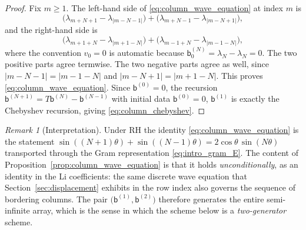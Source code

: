 \documentclass[11pt]{amsart}
\numberwithin{equation}{section}
\theoremstyle{plain}
\theoremstyle{definition}
\theoremstyle{remark}
\newtheorem{remark}[theorem]{Remark}
\newcommand{\RH}{\mathrm{RH}}
\begin{document}
\begin{proof}
Fix $m\ge1$.  The left-hand side of \eqref{eq:column_wave_equation} at index $m$ is
\begin{equation}
 \bigl(\lambda_{m+N+1}-\lambda_{|m-N-1|}\bigr)
 +\bigl(\lambda_{m+N-1}-\lambda_{|m-N+1|}\bigr),
\end{equation}
and the right-hand side is
\begin{equation}
 \bigl(\lambda_{m+1+N}-\lambda_{|m+1-N|}\bigr)
 +\bigl(\lambda_{m-1+N}-\lambda_{|m-1-N|}\bigr),
\end{equation}
where the convention $v_0=0$ is automatic because $\mathsf b^{(N)}_0=\lambda_N-\lambda_N=0$.
The two positive parts agree termwise.  The two negative parts agree as well, since
$|m-N-1|=|m-1-N|$ and $|m-N+1|=|m+1-N|$.  This proves
\eqref{eq:column_wave_equation}.  Since $\mathsf b^{(0)}=0$, the recursion
$\mathsf b^{(N+1)}=T\mathsf b^{(N)}-\mathsf b^{(N-1)}$ with initial data
$\mathsf b^{(0)}=0$, $\mathsf b^{(1)}$ is exactly the Chebyshev recursion, giving
\eqref{eq:column_chebyshev}.
\end{proof}

\begin{remark}[Interpretation]
\label{rem:column_wave_meaning}
Under $\RH$ the identity \eqref{eq:column_wave_equation} is the statement
$\sin((N+1)\theta)+\sin((N-1)\theta)=2\cos\theta\,\sin(N\theta)$ transported through the
Gram representation \eqref{eq:intro_gram_E}.  The content of
Proposition~\ref{prop:column_wave_equation} is that it holds \emph{unconditionally}, as an
identity in the Li coefficients: the same discrete wave equation that
Section~\ref{sec:displacement} exhibits in the row index also governs the sequence of
bordering columns.  The pair $\bigl(\mathsf b^{(1)},\mathsf b^{(2)}\bigr)$ therefore
generates the entire semi-infinite array, which is the sense in which the scheme below is
a \emph{two-generator} scheme.
\end{remark}
\end{document}
